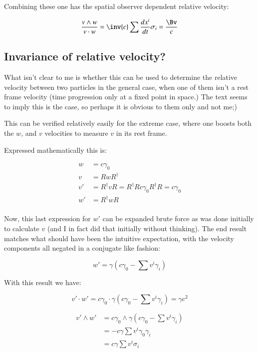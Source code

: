 Combining these one has the spatial observer dependent relative velocity:

\begin{equation}
\frac{v \wedge w}{v \cdot w} = \inv{c} \sum \frac{d x^{i}}{dt} \sigma_{i} = \frac{\Bv}{c}
\end{equation}

\subsection{Invariance of relative velocity? }

What isn't clear to me is whether this can be used to determine the relative velocity between two particles in the general case, when one of them isn't a rest frame velocity (time progression only at a fixed point in space.)
The text seems
to imply this is the case, so perhaps it is obvious to them only and not me;)

This can be verified relatively easily for the extreme case, where one boosts both the $w$, and $v$ velocities to measure $v$ in its rest frame.

Expressed mathematically this is:

\begin{align*}
w &= c \gamma_0 \\
v &= R w R^\dagger \\
v' &= R^\dagger v R = R^\dagger R c \gamma_0 R^\dagger R = c \gamma_0 \\
w' &= R^\dagger w R \\
\end{align*}

Now, this last expression for $w'$ can be expanded brute force as was done initially to calculate $v$ (and I in
fact did that initially without thinking).  The end result matches what should have been the intuitive expectation, with the velocity components all negated in a conjugate like fashion:

\begin{equation*}
w' = \gamma\left( c\gamma_0 - \sum v^i \gamma_i \right)
\end{equation*}

With this result we have:

\begin{equation*}
v' \cdot w' = c \gamma_0 \cdot \gamma\left( c\gamma_0 - \sum v^i \gamma_i \right) = \gamma c^2
\end{equation*}

\begin{align*}
v' \wedge w' 
&= c \gamma_0 \wedge \gamma\left( c\gamma_0 - \sum v^i \gamma_i \right) \\
&= -c \gamma \sum v^i \gamma_0 \gamma_i \\
&= c \gamma \sum v^i \sigma_i \\
\end{align*}

